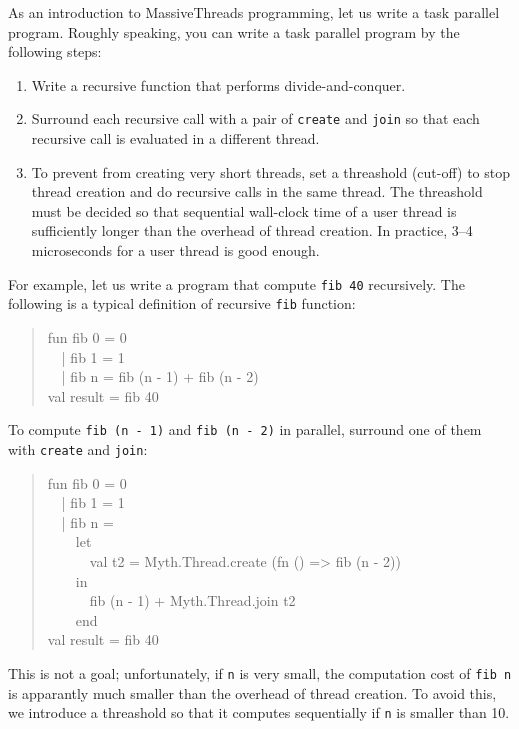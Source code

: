 \documentclass{jbook}
\newenvironment{program}{\begin{quote}\begin{tt}}%
                        {\end{tt}\end{quote}}
\begin{document}
	As an introduction to MassiveThreads programming,
let us write a task parallel program.
	Roughly speaking,
you can write a task parallel program by the following steps:
\begin{enumerate}
\item
	Write a recursive function that performs divide-and-conquer.
\item
	Surround each recursive call with a pair of
{\tt create} and {\tt join} so that
each recursive call is evaluated in a different thread.
\item
	To prevent from creating very short threads,
set a threashold (cut-off) to stop thread creation and do recursive
calls in the same thread.
	The threashold must be decided so that
sequential wall-clock time of a user thread is sufficiently longer than
the overhead of thread creation.
	In practice, 3--4 microseconds for a user thread is good enough.
\end{enumerate}
	For example, let us write a program that compute {\tt fib 40}
recursively.
	The following is a typical definition of recursive {\tt fib} function:
\begin{program}
fun fib 0 = 0\\
\ \ | fib 1 = 1\\
\ \ | fib n = fib (n - 1) + fib (n - 2)\\
val result = fib 40
\end{program}
	To compute 
{\tt fib (n - 1)} and {\tt fib (n - 2)} in parallel,
surround one of them with {\tt create} and {\tt join}:
\begin{program}
fun fib 0 = 0\\
\ \ | fib 1 = 1\\
\ \ | fib n =\\
\ \ \ \ let\\
\ \ \ \ \ \ val t2 = Myth.Thread.create (fn () => fib (n - 2))\\
\ \ \ \ in\\
\ \ \ \ \ \ fib (n - 1) + Myth.Thread.join t2\\
\ \ \ \ end\\
val result = fib 40
\end{program}
        This is not a goal; unfortunately,
if {\tt n} is very small,
the computation cost of {\tt fib n} is apparantly much smaller than
the overhead of thread creation.
	To avoid this,
we introduce a threashold
so that it computes sequentially if {\tt n} is smaller than 10.
\end{document}

